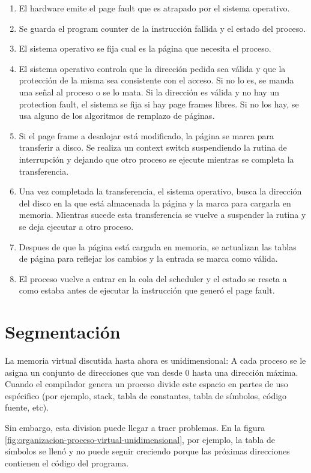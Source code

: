 \begin{enumerate}
	\item El hardware emite el page fault que es atrapado por el sistema operativo.
	\item Se guarda el program counter de la instrucción fallida y el estado del proceso.
	\item El sistema operativo se fija cual es la página que necesita el proceso. 
	\item El sistema operativo controla que la dirección pedida sea válida y que la protección de la misma sea consistente con el acceso. Si no lo es, se manda una señal al proceso o se lo mata. Si la dirección es válida y no hay un protection fault, el sistema se fija si hay page frames libres. Si no los hay, se usa alguno de los algoritmos de remplazo de páginas.
	\item Si el page frame a desalojar está modificado, la página se marca para transferir a disco. Se realiza un context switch suspendiendo la rutina de interrupción y dejando que otro proceso se ejecute mientras se completa la transferencia.
	\item Una vez completada la transferencia, el sistema operativo, busca la dirección del disco en la que está almacenada la página y la marca para cargarla en memoria. Mientras sucede esta transferencia se vuelve a suspender la rutina y se deja ejecutar a otro proceso.
	\item Despues de que la página está cargada en memoria, se actualizan las tablas de página para reflejar los cambios y la entrada se marca como válida.
	\item El proceso vuelve a entrar en la cola del scheduler y el estado se reseta a como estaba antes de ejecutar la instrucción que generó el page fault.
\end{enumerate}

\printbibliography[keyword=memoriaVirtual, title=Bibliografía]

\newpage
\section{Segmentación}
La memoria virtual discutida hasta ahora es unidimensional: A cada proceso se le asigna un conjunto de direcciones que van desde 0 hasta una dirección máxima. Cuando el compilador genera un proceso divide este espacio en partes de uso espécifico (por ejemplo, stack, tabla de constantes, tabla de símbolos, código fuente, etc). 

Sin embargo, esta division puede llegar a traer problemas. En la figura \ref{fig:organizacion-proceso-virtual-unidimensional}, por ejemplo,  la tabla de símbolos se llenó y no puede seguir creciendo porque las próximas direcciones contienen el código del programa.

